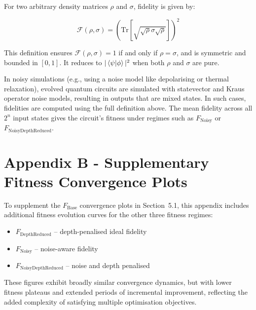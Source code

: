 \documentclass[11pt,a4paper]{article}
\begin{document}
For two arbitrary density matrices $\rho$ and $\sigma$, fidelity is given by:

\[
\mathcal{F}(\rho, \sigma) = \left( \mathrm{Tr}\left[ \sqrt{ \sqrt{\rho} \sigma \sqrt{\rho} } \right] \right)^2
\]

This definition ensures $\mathcal{F}(\rho, \sigma) = 1$ if and only if $\rho = \sigma$, and is symmetric and bounded in $[0, 1]$. It reduces to $|\braket{\psi|\phi}|^2$ when both $\rho$ and $\sigma$ are pure.\newline

In noisy simulations (e.g., using a noise model like depolarising or thermal relaxation), evolved quantum circuits are simulated with statevector and Kraus operator noise models, resulting in outputs that are mixed states. In such cases, fidelities are computed using the full definition above. The mean fidelity across all $2^n$ input states gives the circuit’s fitness under regimes such as $F_{\mathrm{Noisy}}$ or $F_{\mathrm{NoisyDepthReduced}}$.\newpage

\section*{Appendix B - Supplementary Fitness Convergence Plots}
\label{appendix:fitness-convergence}
To supplement the $F_{\mathrm{Base}}$ convergence plots in Section~5.1, this appendix includes additional fitness evolution curves for the other three fitness regimes:

\begin{itemize}
    \item $F_{\mathrm{DepthReduced}}$ – depth-penalised ideal fidelity
    \item $F_{\mathrm{Noisy}}$ – noise-aware fidelity
    \item $F_{\mathrm{NoisyDepthReduced}}$ – noise and depth penalised
\end{itemize}

These figures exhibit broadly similar convergence dynamics, but with lower fitness plateaus and extended periods of incremental improvement, reflecting the added complexity of satisfying multiple optimisation objectives.
\end{document}
